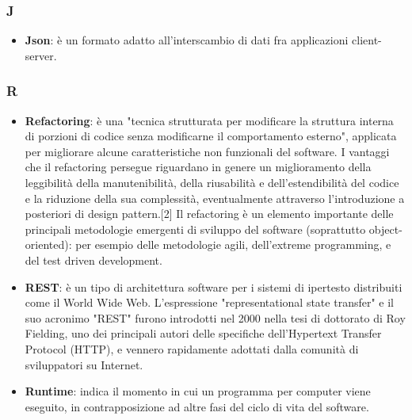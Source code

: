 \subsubsection{J}
\begin{itemize}
	\item \textbf{Json}: è un formato adatto all'interscambio di dati fra applicazioni client-server.
\end{itemize}

\subsubsection{R}
\begin{itemize}
	\item \textbf{Refactoring}:  è una "tecnica strutturata per modificare la struttura interna di porzioni di codice senza modificarne il comportamento esterno", applicata per migliorare alcune caratteristiche non funzionali del software. I vantaggi che il refactoring persegue riguardano in genere un miglioramento della leggibilità della manutenibilità, della riusabilità e dell'estendibilità del codice e la riduzione della sua complessità, eventualmente attraverso l'introduzione a posteriori di design pattern.[2] Il refactoring è un elemento importante delle principali metodologie emergenti di sviluppo del software (soprattutto object-oriented): per esempio delle metodologie agili, dell'extreme programming, e del test driven development.
	\item \textbf{REST}: è un tipo di architettura software per i sistemi di ipertesto distribuiti come il World Wide Web. L'espressione "representational state transfer" e il suo acronimo "REST" furono introdotti nel 2000 nella tesi di dottorato di Roy Fielding, uno dei principali autori delle specifiche dell'Hypertext Transfer Protocol (HTTP), e vennero rapidamente adottati dalla comunità di sviluppatori su Internet.
	\item \textbf{Runtime}: indica il momento in cui un programma per computer viene eseguito, in contrapposizione ad altre fasi del ciclo di vita del software.
\end{itemize}

